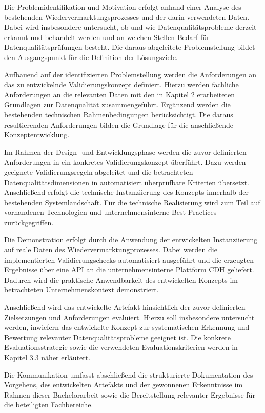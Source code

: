 \documentclass[../main.tex]{subfiles}
\begin{document}
Die Problemidentifikation und Motivation erfolgt anhand einer Analyse des bestehenden Wiedervermarktungsprozesses und der darin verwendeten Daten. Dabei wird insbesondere untersucht, ob und wie Datenqualitätsprobleme derzeit erkannt und behandelt werden und an welchen Stellen Bedarf für Datenqualitätsprüfungen besteht. Die daraus abgeleitete Problemstellung bildet den Ausgangspunkt für die Definition der Lösungsziele.

Aufbauend auf der identifizierten Problemstellung werden die Anforderungen an das zu entwickelnde Validierungskonzept definiert. Hierzu werden fachliche Anforderungen an die relevanten Daten mit den in Kapitel 2 erarbeiteten Grundlagen zur Datenqualität zusammengeführt. Ergänzend werden die bestehenden technischen Rahmenbedingungen berücksichtigt. Die daraus resultierenden Anforderungen bilden die Grundlage für die anschließende Konzeptentwicklung.

Im Rahmen der Design- und Entwicklungsphase werden die zuvor definierten Anforderungen in ein konkretes Validierungskonzept überführt. Dazu werden geeignete Validierungsregeln abgeleitet und die betrachteten Datenqualitätsdimensionen in automatisiert überprüfbare Kriterien übersetzt. Anschließend erfolgt die technische Instanziierung des Konzepts innerhalb der bestehenden Systemlandschaft. Für die technische Realisierung wird zum Teil auf vorhandenen Technologien und unternehmensinterne Best Practices zurückgegriffen.

Die Demonstration erfolgt durch die Anwendung der entwickelten Instanziierung auf reale Daten des Wiedervermarktungprozesses. Dabei werden die implementierten Validierungschecks automatisiert ausgeführt und die erzeugten Ergebnisse über eine API an die unternehmensinterne Plattform CDH geliefert. Dadurch wird die praktische Anwendbarkeit des entwickelten Konzepts im betrachteten Unternehmenskontext demonstriert.

Anschließend wird das entwickelte Artefakt hinsichtlich der zuvor definierten Zielsetzungen und Anforderungen evaluiert. Hierzu soll insbesondere untersucht werden, inwiefern das entwickelte Konzept zur systematischen Erkennung und Bewertung relevanter Datenqualitätsprobleme geeignet ist. Die konkrete Evaluationsstrategie sowie die verwendeten Evaluationskriterien werden in Kapitel 3.3 näher erläutert.

Die Kommunikation umfasst abschließend die strukturierte Dokumentation des Vorgehens, des entwickelten Artefakts und der gewonnenen Erkenntnisse im Rahmen dieser Bachelorarbeit sowie die Bereitstellung relevanter Ergebnisse für die beteiligten Fachbereiche.
\end{document}
